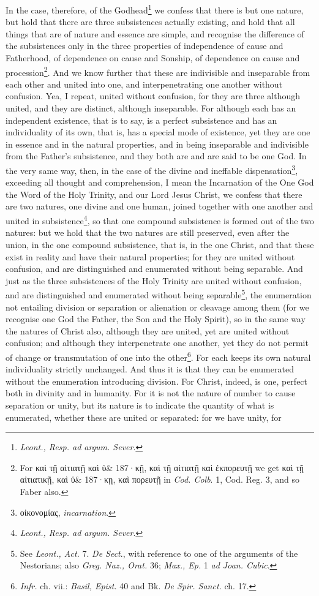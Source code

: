 In the case, therefore, of the Godhead\footnote{\emph{Leont., Resp. ad argum. Sever}.} we confess that there is but one nature, but hold that there are three subsistences actually existing, and hold that all things that are of nature and essence are simple, and recognise the difference of the subsistences only in the three properties of independence of cause and Fatherhood, of dependence on cause and Sonship, of dependence on cause and procession\footnote{For \textgreek{καὶ τῇ αἰτιατῇ καὶ ὑ\& 187·κῇ, καὶ τῇ αἰτιατῇ καὶ ἐκπορευτῇ} we get \textgreek{καὶ τῇ αἰτιατικῇ, καὶ ὑ\& 187·κῃ, καὶ πορευτῇ} in \emph{Cod. Colb}. 1, Cod. Reg. 3, and so Faber also.}. And we know further that these are indivisible and inseparable from each other and united into one, and interpenetrating one another without confusion. Yea, I repeat, united without confusion, for they are three although united, and they are distinct, although inseparable. For although each has an independent existence, that is to say, is a perfect subsistence and has an individuality of its own, that is, has a special mode of existence, yet they are one in essence and in the natural properties, and in being inseparable and indivisible from the Father’s subsistence, and they both are and are said to be one God. In the very same way, then, in the case of the divine and ineffable dispensation\footnote{\textgreek{οἰκονομίας}, \emph{incarnation}.}, exceeding all thought and comprehension, I mean the Incarnation of the One God the Word of the Holy Trinity, and our Lord Jesus Christ, we confess that there are two natures, one divine and one human, joined together with one another and united in subsistence\footnote{\emph{Leont., Resp. ad argum. Sever}.}, so that one compound subsistence is formed out of the two natures: but we hold that the two natures are still preserved, even after the union, in the one compound subsistence, that is, in the one Christ, and that these exist in reality and have their natural properties; for they are united without confusion, and are distinguished and enumerated without being separable. And just as the three subsistences of the Holy Trinity are united without confusion, and are distinguished and enumerated without being separable\footnote{See \emph{Leont., Act. }7. \emph{De Sect}., with reference to one of the arguments of the Nestorians; also \emph{Greg. Naz., Orat. }36; \emph{Max., Ep. }1 \emph{ad Joan. Cubic}.}, the enumeration not entailing division or separation or alienation or cleavage among them (for we recognise one God the Father, the Son and the Holy Spirit), so in the same way the natures of Christ also, although they are united, yet are united without confusion; and although they interpenetrate one another, yet they do not permit of change or transmutation of one into the other\footnote{\emph{Infr.} ch. vii.:\emph{ Basil, Epist. }40 and Bk. \emph{De Spir. Sanct. }ch. 17.}. For each keeps its own natural individuality strictly unchanged. And thus it is that they can be enumerated without the enumeration introducing division. For Christ, indeed, is one, perfect both in divinity and in humanity. For it is not the nature of number to cause separation or unity, but its nature is to indicate the quantity of what is enumerated, whether these are united or separated: for we have unity, for 